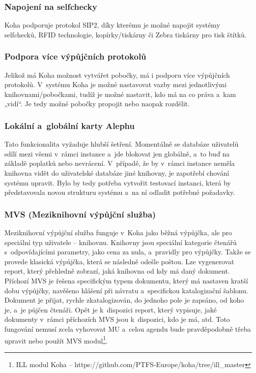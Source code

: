 \documentclass[
	11pt, oneside, printed, final, palatino
	microtype,
	table,   %
	lof,     %
	lot     %
]{fithesis3}
\begin{document}
{\subsubsection{{\large Napojení na selfchecky}}
Koha podporuje protokol SIP2, díky kterému je možné napojit systémy selfchecků, RFID technologie, kopírky/tiskárny či Zebra tiskárny pro tisk štítků.%

\subsubsection{{\large Podpora více výpůjčních protokolů}}
Jelikož má Koha možnost vytvářet pobočky, má i podporu více výpůjčních protokolů. V~systému Koha je možné nastavovat vazby mezi jednotlivými knihovnami/pobočkami, tudíž je možné nastavit, kdo má na co práva a~kam „vidí“. Je tedy možné pobočky propojit nebo naopak rozdělit.

\subsubsection{{\large Lokální a~globální karty Alephu}}
Tato funkcionalita vyžaduje hlubší šetření. Momentálně se databáze uživatelů sdílí mezi všemi v~rámci instance a~jde blokovat jen globálně, a~to buď na základě poplatků nebo nevrácení. V~případě, že by v~rámci instance neměla knihovna vidět do uživatelské databáze jiné knihovny, je zapotřebí chování systému upravit. Bylo by tedy potřeba vytvořit testovací instanci, která by představovala novou strukturu systému a~na ní odladit potřebné požadavky.

\subsubsection{{\large MVS (Meziknihovní výpůjční služba)}}
Meziknihovní výpůjční služba funguje v~Koha jako běžná výpůjčka, ale pro speciální typ uživatele – knihovnu. Knihovny jsou speciální kategorie čtenářů s~odpovídajícími parametry, jako cena za nula, a~pravidly pro výpůjčky. Takže se provede klasická výpůjčka, která se následně odešle poštou. Lze vygenerovat report, který přehledně zobrazí, jaká knihovna od kdy má daný dokument. Příchozí MVS je řešena specifickým typem dokumentu, který má nastaven kratší dobu výpůjčky, navěšeno hlášení při návratu a~specifickou katalogizační šablonu. Dokument je přijat, rychle zkatalogizován, do jednoho pole je zapsáno, od koho je, a~je půjčen čtenáři. Opět je k~dispozici report, který vypisuje, jaké dokumenty v~rámci příchozích MVS jsou k~dispozici, kdo je má, atd. Toto fungování nemusí zcela vyhovovat MU a~celou agendu bude pravděpodobně třeba upravit nebo použít MVS modul\footnote{ILL modul Koha – https://github.com/PTFS-Europe/koha/tree/ill\_master}.

}
\end{document}
